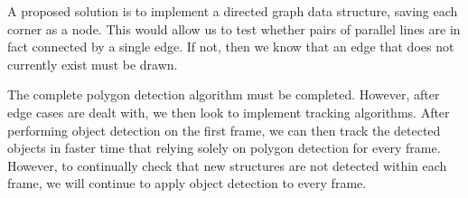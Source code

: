 \documentclass[12pt]{article}
\begin{document}
	A proposed solution is to implement a directed graph data structure, saving each corner as a node. This would allow us to test whether pairs of parallel lines are in fact connected by a single edge. If not, then we know that an edge that does not currently exist must be drawn. 

	The complete polygon detection algorithm must be completed. However, after edge cases are dealt with, we then look to implement tracking algorithms. After performing object detection on the first frame, we can then track the detected objects in faster time that relying solely on polygon detection for every frame. However, to continually check that new structures are not detected within each frame, we will continue to apply object detection to every frame.



\end{document}
